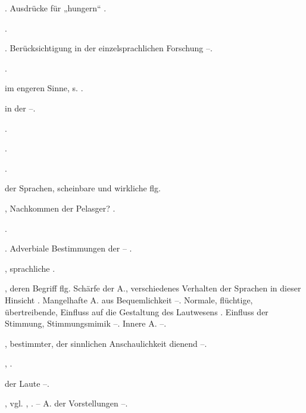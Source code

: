 \begin{register}
. Ausdrücke für „hungern“ \pageref{sp.482}.

 \pageref{sp.248}.


 \pageref{sp.107}. Berücksichtigung in der einzelsprachlichen Forschung \pageref{sp.125}–\pageref{sp.127}.

 \pageref{sp.45}.

 im engeren Sinne, s. .

 in der  \pageref{sp.249}–\pageref{sp.250}.

 \pageref{sp.20}.

 \pageref{sp.267}.

 \pageref{sp.256}.

 der Sprachen, scheinbare und wirkliche \pageref{sp.406} flg.

, Nachkommen der Pelasger? \pageref{sp.146}.

 \pageref{sp.256}. 


. Adverbiale Bestimmungen der – \pageref{sp.101}.

, sprachliche \pageref{sp.15}.


, deren Begriff \pageref{sp.4} flg. Schärfe der A., verschiedenes Verhalten der Sprachen in dieser Hinsicht \pageref{sp.34}. Mangelhafte A. aus Bequemlichkeit \pageref{sp.181}–\pageref{sp.182}. Normale, flüchtige, übertreibende, Einfluss auf die Gestaltung des Lautwesens \pageref{sp.183}.  Einfluss der Stimmung, Stimmungsmimik \pageref{sp.376}–\pageref{sp.380}. Innere A. \pageref{sp.432}–\pageref{sp.437}.

, bestimmter, der sinnlichen Anschaulichkeit dienend \pageref{sp.415}–\pageref{sp.416}.

 \pageref{sp.150}, \pageref{sp.282}.

 der Laute \pageref{sp.37}–\pageref{sp.38}.

, vgl. , . – A. der Vorstellungen \pageref{sp.43}–\pageref{sp.44}.


\end{register}
